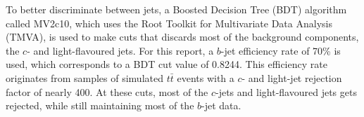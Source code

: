 \documentclass[12pt,a4paper]{article}
\numberwithin{equation}{section}
\begin{document}
To better discriminate between jets, a Boosted Decision Tree (BDT) algorithm
called MV2c10, which uses the Root Toolkit for Multivariate Data Analysis
(TMVA), is used to make cuts that discards most of the background components,
the $c$- and light-flavoured jets. For this report, a $b$-jet efficiency rate of
70\% is used, which corresponds to a BDT cut value of 0.8244. This efficiency
rate originates from samples of simulated $t\bar t$ events with a $c$- and
light-jet rejection factor of nearly 400\cite{ATL-PHYS-PUB-2016-012}. At these
cuts, most of the $c$-jets and light-flavoured jets gets rejected, while still
maintaining most of the $b$-jet data.

\end{document}
